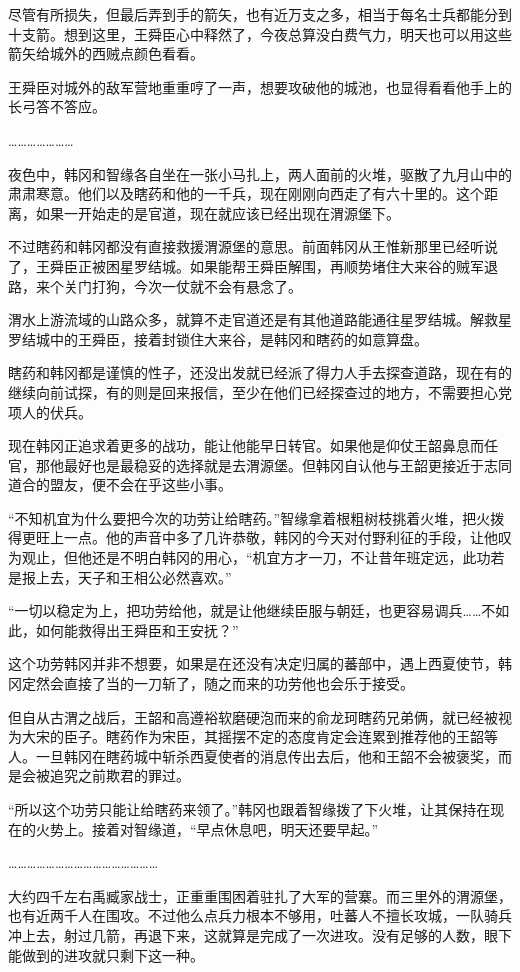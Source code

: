 尽管有所损失，但最后弄到手的箭矢，也有近万支之多，相当于每名士兵都能分到十支箭。想到这里，王舜臣心中释然了，今夜总算没白费气力，明天也可以用这些箭矢给城外的西贼点颜色看看。

王舜臣对城外的敌军营地重重哼了一声，想要攻破他的城池，也显得看看他手上的长弓答不答应。

…………………

夜色中，韩冈和智缘各自坐在一张小马扎上，两人面前的火堆，驱散了九月山中的肃肃寒意。他们以及瞎药和他的一千兵，现在刚刚向西走了有六十里的。这个距离，如果一开始走的是官道，现在就应该已经出现在渭源堡下。

不过瞎药和韩冈都没有直接救援渭源堡的意思。前面韩冈从王惟新那里已经听说了，王舜臣正被困星罗结城。如果能帮王舜臣解围，再顺势堵住大来谷的贼军退路，来个关门打狗，今次一仗就不会有悬念了。

渭水上游流域的山路众多，就算不走官道还是有其他道路能通往星罗结城。解救星罗结城中的王舜臣，接着封锁住大来谷，是韩冈和瞎药的如意算盘。

瞎药和韩冈都是谨慎的性子，还没出发就已经派了得力人手去探查道路，现在有的继续向前试探，有的则是回来报信，至少在他们已经探查过的地方，不需要担心党项人的伏兵。

现在韩冈正追求着更多的战功，能让他能早日转官。如果他是仰仗王韶鼻息而任官，那他最好也是最稳妥的选择就是去渭源堡。但韩冈自认他与王韶更接近于志同道合的盟友，便不会在乎这些小事。

“不知机宜为什么要把今次的功劳让给瞎药。”智缘拿着根粗树枝挑着火堆，把火拨得更旺上一点。他的声音中多了几许恭敬，韩冈的今天对付野利征的手段，让他叹为观止，但他还是不明白韩冈的用心，“机宜方才一刀，不让昔年班定远，此功若是报上去，天子和王相公必然喜欢。”

“一切以稳定为上，把功劳给他，就是让他继续臣服与朝廷，也更容易调兵……不如此，如何能救得出王舜臣和王安抚？”

这个功劳韩冈并非不想要，如果是在还没有决定归属的蕃部中，遇上西夏使节，韩冈定然会直接了当的一刀斩了，随之而来的功劳他也会乐于接受。

但自从古渭之战后，王韶和高遵裕软磨硬泡而来的俞龙珂瞎药兄弟俩，就已经被视为大宋的臣子。瞎药作为宋臣，其摇摆不定的态度肯定会连累到推荐他的王韶等人。一旦韩冈在瞎药城中斩杀西夏使者的消息传出去后，他和王韶不会被褒奖，而是会被追究之前欺君的罪过。

“所以这个功劳只能让给瞎药来领了。”韩冈也跟着智缘拨了下火堆，让其保持在现在的火势上。接着对智缘道，“早点休息吧，明天还要早起。”

…………………………………………

大约四千左右禹臧家战士，正重重围困着驻扎了大军的营寨。而三里外的渭源堡，也有近两千人在围攻。不过他么点兵力根本不够用，吐蕃人不擅长攻城，一队骑兵冲上去，射过几箭，再退下来，这就算是完成了一次进攻。没有足够的人数，眼下能做到的进攻就只剩下这一种。

